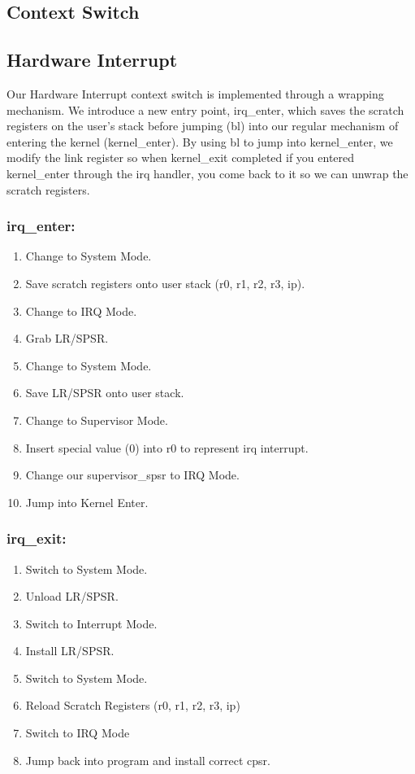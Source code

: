 \documentclass{article}
\begin{document}
\subsection{Context Switch}

\subsection{Hardware Interrupt}

Our Hardware Interrupt context switch is implemented through a wrapping mechanism. We introduce a new entry point, irq\_enter, which saves the scratch registers on the user's stack before jumping (bl) into our regular mechanism of entering the kernel (kernel\_enter). By using bl to jump into kernel\_enter, we modify the link register so when kernel\_exit completed if you entered kernel\_enter through the irq handler, you come back to it so we can unwrap the scratch registers.

\subsubsection{irq\_enter:}
\begin{enumerate}
    \item Change to System Mode.
    \item Save scratch registers onto user stack (r0, r1, r2, r3, ip).
    \item Change to IRQ Mode.
    \item Grab LR/SPSR.
    \item Change to System Mode. 
    \item Save LR/SPSR onto user stack.
    \item Change to Supervisor Mode.
    \item Insert special value (0) into r0 to represent irq interrupt.
    \item Change our supervisor\_spsr to IRQ Mode.
    \item Jump into Kernel Enter.
\end{enumerate}

\subsubsection{irq\_exit:}
\begin{enumerate}
    \item Switch to System Mode.
    \item Unload LR/SPSR.
    \item Switch to Interrupt Mode.
    \item Install LR/SPSR.
    \item Switch to System Mode.
    \item Reload Scratch Registers (r0, r1, r2, r3, ip)
    \item Switch to IRQ Mode
    \item Jump back into program and install correct cpsr.
\end{enumerate}
\end{document}
